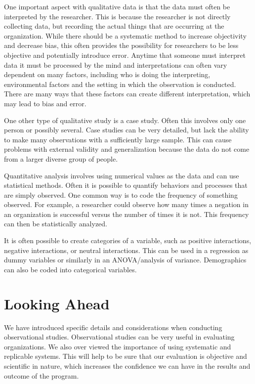 \documentclass[]{book}
\theoremstyle{definition}
\theoremstyle{definition}
\theoremstyle{definition}
\theoremstyle{remark}
\begin{document}
One important aspect with qualitative data is that the data must often
be interpreted by the researcher. This is because the researcher is not
directly collecting data, but recording the actual things that are
occurring at the organization. While there should be a systematic method
to increase objectivity and decrease bias, this often provides the
possibility for researchers to be less objective and potentially
introduce error. Anytime that someone must interpret data it must be
processed by the mind and interpretations can often vary dependent on
many factors, including who is doing the interpreting, environmental
factors and the setting in which the observation is conducted. There are
many ways that these factors can create different interpretation, which
may lead to bias and error.

One other type of qualitative study is a case study. Often this involves
only one person or possibly several. Case studies can be very detailed,
but lack the ability to make many observations with a sufficiently large
sample. This can cause problems with external validity and
generalization because the data do not come from a larger diverse group
of people.

Quantitative analysis involves using numerical values as the data and
can use statistical methods. Often it is possible to quantify behaviors
and processes that are simply observed. One common way is to code the
frequency of something observed. For example, a researcher could observe
how many times a negation in an organization is successful versus the
number of times it is not. This frequency can then be statistically
analyzed.

It is often possible to create categories of a variable, such as
positive interactions, negative interactions, or neutral interactions.
This can be used in a regression as dummy variables or similarly in an
ANOVA/analysis of variance. Demographics can also be coded into
categorical variables.

\hypertarget{looking-ahead-6}{%
\section{Looking Ahead}\label{looking-ahead-6}}

We have introduced specific details and considerations when conducting
observational studies. Observational studies can be very useful in
evaluating organizations. We also over viewed the importance of using
systematic and replicable systems. This will help to be sure that our
evaluation is objective and scientific in nature, which increases the
confidence we can have in the results and outcome of the program.
\end{document}
